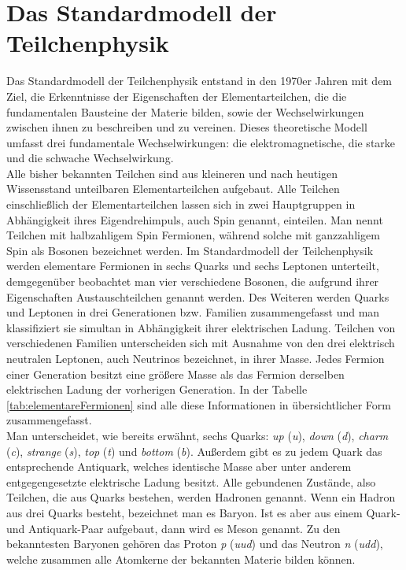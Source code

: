 \documentclass[12pt,a4paper]{report}
\begin{document}
\section{Das Standardmodell der Teilchenphysik}
\label{sec:DasSMT}
Das Standardmodell der Teilchenphysik entstand in den 1970er Jahren mit dem Ziel, die Erkenntnisse der Eigenschaften der Elementarteilchen, die die fundamentalen Bausteine der Materie bilden, sowie der \sloppy Wechselwirkungen zwischen ihnen zu beschreiben und zu vereinen. Dieses theoretische Modell umfasst drei fundamentale Wechselwirkungen: die elektromagnetische, die starke und die schwache Wechselwirkung. \\
Alle bisher bekannten Teilchen sind aus kleineren und nach heutigen Wissensstand unteilbaren Elementarteilchen aufgebaut. Alle Teilchen einschließlich der Elementarteilchen lassen sich in zwei Hauptgruppen in Abhängigkeit ihres Eigendrehimpuls, auch Spin genannt, einteilen. Man nennt Teilchen mit halbzahligem Spin Fermionen, während solche mit ganzzahligem Spin als Bosonen bezeichnet werden. Im Standardmodell der Teilchenphysik werden elementare Fermionen in sechs Quarks und sechs Leptonen unterteilt, demgegenüber beobachtet man vier verschiedene Bosonen, die aufgrund ihrer Eigenschaften Austauschteilchen genannt werden. Des Weiteren werden Quarks und Leptonen in drei Generationen bzw. Familien zusammengefasst und man klassifiziert sie simultan in Abhängigkeit ihrer elektrischen Ladung. Teilchen von verschiedenen Familien unterscheiden sich mit Ausnahme von den drei elektrisch neutralen Leptonen, auch Neutrinos bezeichnet, in ihrer Masse. Jedes Fermion einer Generation besitzt eine größere Masse als das Fermion derselben elektrischen Ladung der vorherigen Generation. In der Tabelle \ref{tab:elementareFermionen} sind alle diese Informationen in übersichtlicher Form zusammengefasst. \\
Man unterscheidet, wie bereits erwähnt, sechs Quarks: \textit{up} (\textit{u}), \textit{down} (\textit{d}), \textit{charm} (\textit{c}), \sloppy \textit{strange} (\textit{s}), \textit{top} (\textit{t}) und \textit{bottom} (\textit{b}). Außerdem gibt es zu jedem Quark das entsprechende Antiquark, welches identische Masse aber unter anderem entgegengesetzte elektrische Ladung besitzt. Alle gebundenen Zustände, also Teilchen, die aus Quarks bestehen, werden Hadronen genannt. Wenn ein Hadron aus drei Quarks besteht, bezeichnet man es Baryon. Ist es aber aus einem Quark- und Antiquark-Paar aufgebaut, dann wird es Meson genannt. Zu den bekanntesten Baryonen gehören das Proton \textit{p} (\textit{uud}) und das Neutron \textit{n} (\textit{udd}), welche zusammen alle Atomkerne der bekannten Materie bilden können. \\
\end{document}
